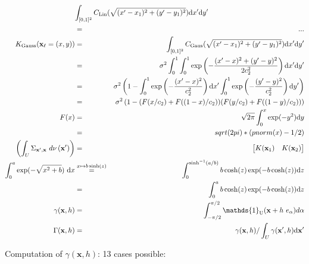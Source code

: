 \documentclass[12pt]{article}
\theoremstyle{definition}
\theoremstyle{remark}
\newcommand{\dominantU}{\nu}
\newcommand{\Covariogram}{C}
\newcommand{\derive}{\mathrm{d}}
\newcommand{\Pop}{\mathrm{U}}
\newcommand{\position}{\mathbf{x}}
\begin{document}
\begin{eqnarray*}
\lefteqn{\int_{[0,1]^2}\Covariogram_{\text{Lin}}(\sqrt{(x'-x_1)^2+(y'-y_1)^2})\derive x'\derive y'}\\&=&...\\
K_{\text{Gauss}}(\position_\ell=(x,y))&=&
\int_{[0,1]^2}\Covariogram_{\text{Gaus}}(\sqrt{(x'-x_1)^2+(y'-y_1)^2})\derive x'\derive y'\\&=&
\sigma^2\int_0^1\int_0^1 \exp\left(-\frac{(x'-x)^2+(y'-y)^2}{2c_2^2}\right)\derive x'\derive y'\\&=&
\sigma^2\left(1-\int_0^1 \exp\left(-\frac{(x'-x)^2}{c_2^2}\right)\derive x'\int_0^1\exp\left(-\frac{(y'-y)^2}{c_2^2}\right)\derive y'\right)\\&=&
\sigma^2\left(1-(F(x/c_2)+F((1-x)/c_2))(F(y/c_2)+F((1-y)/c_2))\right)\\
F(x)
&=&\sqrt{2\pi}\int_{0}^x \exp(-y^2) \derive y\\
&=&sqrt(2pi)*(pnorm(x)-1/2)\\
\left(\int_{U}\Sigma_{\position',\position}~d\dominantU\left(\position'\right)\right)&=&
\begin{bmatrix}K(\position_1)&K(\position_2)\end{bmatrix}
\\
\int_0^a\exp(-\sqrt{x^2+b})~\derive x&\stackrel{x\mapsto b\sinh(z)}{=}&\int_0^{\sinh^{-1}(a/b)}b\cosh(z)\exp(-b\cosh(z))\derive z\\
&=&\int_0^ab\cosh(z)\exp(-b\cosh(z))\derive z\\
\gamma(\position,h)&=&\int_{-\pi/2}^{\pi/2}\mathds{1}_\Pop(\position+h~e_\alpha) d\alpha\\
\Gamma(\position,h)&=&\gamma(\position,h)/\int_{U}\gamma(\position',h)\derive\position'
\end{eqnarray*}

Computation of $\gamma(\position,h)$: 13 cases possible:
\end{document}
